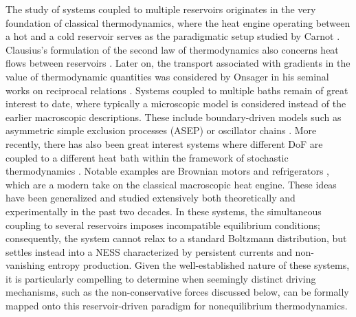 The study of systems coupled to multiple reservoirs originates in the very foundation of classical thermodynamics, where the heat engine operating between a hot and a cold reservoir serves as the paradigmatic setup studied by Carnot \cite{carnot1872reflexions}. Clausius's formulation of the second law of thermodynamics also concerns heat flows between reservoirs \cite{clausius1879mechanical}. Later on, the transport associated with gradients in the value of thermodynamic quantities was considered by Onsager in his seminal works on reciprocal relations \cite{onsager1931reciprocal}. Systems coupled to multiple baths remain of great interest to date, where typically a microscopic model is considered instead of the earlier macroscopic descriptions. These include boundary-driven models such as asymmetric simple exclusion processes (ASEP) \cite{krug1991boundary, derrida1998exactly, derrida2007non} or oscillator chains \cite{kipnis1982heat, eckmann1999non}. More recently, there has also been great interest systems where different DoF are coupled to a different heat bath within the framework of stochastic thermodynamics \cite{seifert2012stochastic}. Notable examples are Brownian motors and refrigerators \cite{van2004microscopic, van2006brownian, filliger2007brownian}, which are a modern take on the classical macroscopic heat engine. These ideas have been generalized and studied extensively both theoretically and experimentally \cite{ dotsenko2013two, mancois2018two, bae2021inertial, baldassarri2020engineered,cerasoli2018asymmetry, cerasoli2022spectral, argun2017experimental, martins2026role, chang2021autonomous, dos2021stationary, pietzonka2018universal, lin2022stochastic, movilla2021energy, abdoli2022tunable, chiang2017electrical, ciliberto2013heat, PhysRevE.92.032118, abdoli2025quadrupolar, visco2006work, berut2014energy, berut2016stationary, fogedby2011bound, fogedby2017minimal, leighton2024information, netz2020approach} in the past two decades. In these systems, the simultaneous coupling to several reservoirs imposes incompatible equilibrium conditions; consequently, the system cannot relax to a standard Boltzmann distribution, but settles instead into a NESS characterized by persistent currents and non-vanishing entropy production. Given the well-established nature of these systems, it is particularly compelling to determine when seemingly distinct driving mechanisms, such as the non-conservative forces discussed below, can be formally mapped onto this reservoir-driven paradigm for nonequilibrium thermodynamics.

